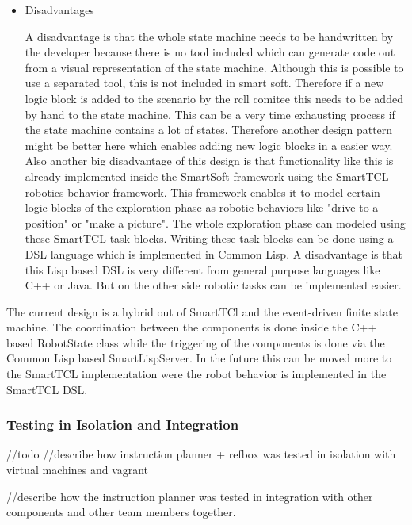 \begin{itemize}
\item Disadvantages

A disadvantage is that the whole state machine needs to be handwritten by the developer because there is no tool included which can generate code out from a visual representation 
of the state machine. Although this is possible to use a separated tool, this is not included in smart soft. Therefore if a new logic block is added to the scenario by the rcll comitee this needs to be added by hand to the state machine. This can be a very time exhausting process if the state machine contains a lot of states. Therefore another design pattern might be better here which enables adding new logic blocks in a easier way. \\

Also another big disadvantage of this design is that functionality like this is already implemented inside the SmartSoft framework using the SmartTCL robotics behavior framework.
This framework enables it to model certain logic blocks of the exploration phase as robotic behaviors like "drive to a position" or "make a picture". The whole exploration phase can modeled using these SmartTCL task blocks. Writing these task blocks can be done using a DSL language which is implemented in Common Lisp. A disadvantage is that this Lisp based DSL is 
very different from general purpose languages like C++ or Java. But on the other side robotic tasks can be implemented easier. 


\end{itemize}


The current design is a hybrid out of SmartTCl and the event-driven finite state machine. The coordination between the components is done inside the C++ based RobotState class while the
triggering of the components is done via the Common Lisp based SmartLispServer. In the future this can be moved more to the SmartTCL implementation were the robot behavior is implemented in the SmartTCL DSL. 


\subsubsection{Testing in Isolation and Integration}

//todo 
//describe how instruction planner + refbox was tested in isolation
with virtual machines and vagrant 

//describe how the instruction planner was tested in integration with other components and 
other team members together. 

